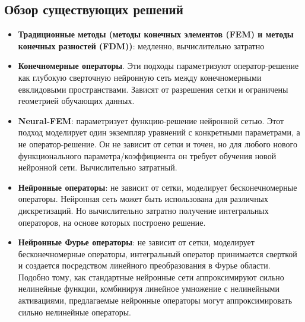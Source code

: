 \subsection{Обзор существующих решений}
	\begin{itemize}
		\item \textbf{Традиционные методы (методы конечных элементов (FEM) и методы конечных разностей (FDM))}: медленно, вычислительно затратно
		\item \textbf{Конечномерные операторы}. Эти подходы параметризуют оператор-решение как глубокую сверточную нейронную сеть между конечномерными евклидовыми пространствами. Зависят от разрешения сетки и ограничены геометрией обучающих данных.
		\item \textbf{Neural-FEM}: параметризует функцию-решение  нейронной сетью. Этот подход моделирует один экземпляр уравнений с конкретными параметрами, а не оператор-решение. Он не зависит от сетки и точен, но для любого нового функционального параметра/коэффициента он требует обучения новой нейронной сети. Вычислительно затратный.
		\item \textbf{Нейронные операторы}: не зависит от сетки, моделирует бесконечномерные операторы. Нейронная сеть может быть использована для различных дискретизаций. Но вычислительно затратно получение интегральных операторов, на основе которых построено решение.
		\item \textbf{Нейронные Фурье операторы}: не зависит от сетки, моделирует бесконечномерные операторы, интегральный оператор принимается сверткой и создается посредством линейного преобразования в Фурье области. Подобно тому, как стандартные нейронные сети аппроксимируют сильно нелинейные функции, комбинируя линейное умножение с нелинейными активациями, предлагаемые нейронные операторы могут аппроксимировать сильно нелинейные операторы.
	\end{itemize}


